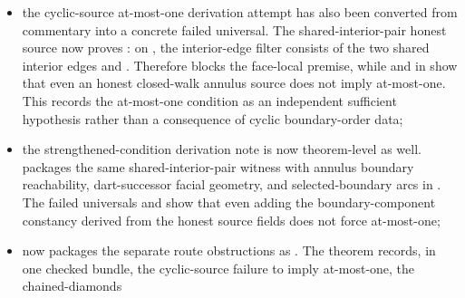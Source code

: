 \documentclass[11pt]{article}
\begin{document}
\begin{itemize}
and
.
The bundle
shows that this Tait-colorable, nonempty-carrier benchmark also carries the
same obstruction that blocks the current annulus-root and face-layer
construction routes on the fixed embedding;
\item the cyclic-source at-most-one derivation attempt has also been converted
from commentary into a concrete failed universal.  The shared-interior-pair
honest source now proves
: on
, the interior-edge filter consists of the two shared interior
edges  and .  Therefore
 blocks the
face-local premise, while
 and
 in
 show that even an honest
closed-walk annulus source does not imply at-most-one.  This records the
at-most-one condition as an independent sufficient hypothesis rather than a
consequence of cyclic boundary-order data;
\item the strengthened-condition derivation note is now theorem-level as well.
 packages the same
shared-interior-pair witness with annulus boundary reachability,
dart-successor facial geometry, and selected-boundary arcs in
.
The failed universals
and
show that even adding the boundary-component constancy derived from the honest
source fields does not force at-most-one;
\item {} now packages the
separate route obstructions as
.  The theorem records, in one checked
bundle, the cyclic-source failure to imply at-most-one, the chained-diamonds

\end{itemize}
\end{document}
